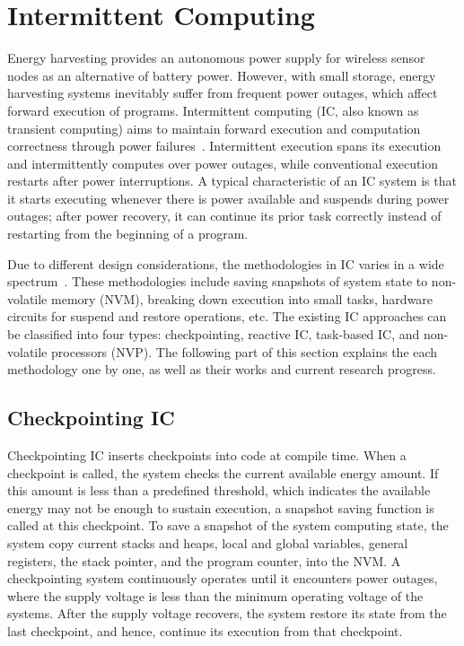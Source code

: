 

\section{Intermittent Computing} \label{sec:ips}

Energy harvesting provides an autonomous power supply for wireless sensor nodes as an alternative of battery power. However, with small storage, energy harvesting systems inevitably suffer from frequent power outages, which affect forward execution of programs. Intermittent computing (IC, also known as transient computing) aims to maintain forward execution and computation correctness through power failures~\cite{ransford2012mementos}. Intermittent execution spans its execution and intermittently computes over power outages, while conventional execution restarts after power interruptions. A typical characteristic of an IC system is that it starts executing whenever there is power available and suspends during power outages; after power recovery, it can continue its prior task correctly instead of restarting from the beginning of a program. 

Due to different design considerations, the methodologies in IC varies in a wide spectrum~\cite{sliper2018enabling}. These methodologies include saving snapshots of system state to non-volatile memory (NVM), breaking down execution into small tasks, hardware circuits for suspend and restore operations, etc. The existing IC approaches can be classified into four types: checkpointing, reactive IC, task-based IC, and non-volatile processors (NVP). The following part of this section explains the each methodology one by one, as well as their works and current research progress.

\subsection{Checkpointing IC}

Checkpointing IC inserts checkpoints into code at compile time. When a checkpoint is called, the system checks the current available energy amount. If this amount is less than a predefined threshold, which indicates the available energy may not be enough to sustain execution, a snapshot saving function is called at this checkpoint. To save a snapshot of the system computing state, the system copy current stacks and heaps, local and global variables, general registers, the stack pointer, and the program counter, into the NVM. A checkpointing system continuously operates until it encounters power outages, where the supply voltage is less than the minimum operating voltage of the systems. After the supply voltage recovers, the system restore its state from the last checkpoint, and hence, continue its execution from that checkpoint. 

